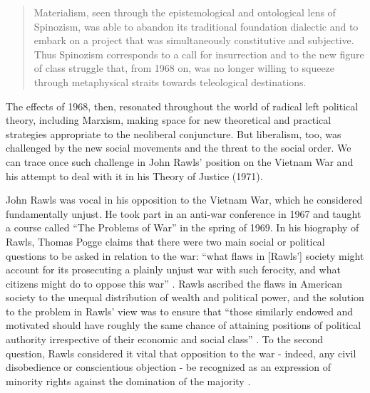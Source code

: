 \documentclass[12pt,oneside]{memoir}
\begin{document}
\begin{quote}
Materialism, seen through the epistemological and ontological lens of Spinozism, was able to abandon its traditional foundation dialectic and to embark on a project that was simultaneously constitutive and subjective. Thus Spinozism corresponds to a call for insurrection and to the new figure of class struggle that, from 1968 on, was no longer willing to squeeze through metaphysical straits towards teleological destinations. \citep[vii-viii]{Negri2020}
\end{quote} 

The effects of 1968, then, resonated throughout the world of radical left political theory, including Marxism, making space for new theoretical and practical strategies appropriate to the neoliberal conjuncture. But liberalism, too, was challenged by the new social movements and the threat to the social order. We can trace once such challenge in John Rawls' position on the Vietnam War and his attempt to deal with it in his Theory of Justice (1971).

John Rawls was vocal in his opposition to the Vietnam War, which he considered fundamentally unjust. He took part in an anti-war conference in 1967 and taught a course called ``The Problems of War'' in the spring of 1969. In his biography of Rawls, Thomas Pogge claims that there were two main social or political questions to be asked in relation to the war: ``what flaws in [Rawls'] society might account for its prosecuting a plainly unjust war with such ferocity, and what citizens might do to oppose this war'' \citep[19]{Pogge2007}. Rawls ascribed the flaws in American society to the unequal distribution of wealth and political power, and the solution to the problem in Rawls' view was to ensure that ``those similarly endowed and motivated should have roughly the same chance of attaining positions of political authority irrespective of their economic and social class'' \citep[225]{Rawls2005}. To the second question, Rawls considered it vital that opposition to the war - indeed, any civil disobedience or conscientious objection - be recognized as an expression of minority rights against the domination of the majority \citep[19]{Pogge2007}.
\end{document}
